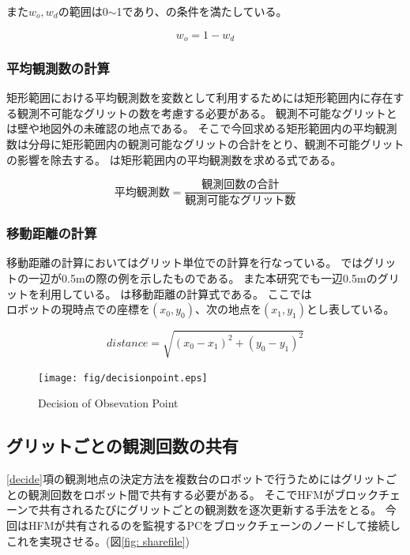 \documentclass{jsarticle}
\begin{document}
また$w_o,w_d$の範囲は0$\sim$1であり、の条件を満たしている。

\begin{equation}
  w_o = 1 - w_d
	\label{eqn: weight}
\end{equation}

\subsubsection{平均観測数の計算}
矩形範囲における平均観測数を変数として利用するためには矩形範囲内に存在する観測不可能なグリットの数を考慮する必要がある。
観測不可能なグリットとは壁や地図外の未確認の地点である。
そこで今回求める矩形範囲内の平均観測数は分母に矩形範囲内の観測可能なグリットの合計をとり、観測不可能グリットの影響を除去する。
は矩形範囲内の平均観測数を求める式である。

\begin{equation}
  平均観測数 = \frac{観測回数の合計}{観測可能なグリット数}
	\label{eqn: observation}
\end{equation}

\subsubsection{移動距離の計算}
移動距離の計算においてはグリット単位での計算を行なっている。
ではグリットの一辺が0.5mの際の例を示したものである。
また本研究でも一辺0.5mのグリットを利用している。
は移動距離の計算式である。
ここでは$ロボットの現時点での座標を(x_0, y_0)、次の地点を(x_1,y_1)$とし表している。


\begin{equation}
  distance = \sqrt{(x_0-x_1)^2 + (y_0-y_1)^2}
	\label{eqn: distance}
\end{equation}


\begin{figure}[tbh]
 \centering
  \texttt{[image: fig/decisionpoint.eps]}
  \vspace*{-4mm}
  \caption{Decision of Obsevation Point}
  \label{fig: value-method}
\end{figure}

\subsection{グリットごとの観測回数の共有}
\ref{decide}項の観測地点の決定方法を複数台のロボットで行うためにはグリットごとの観測回数をロボット間で共有する必要がある。
そこでHFMがブロックチェーンで共有されるたびにグリットごとの観測数を逐次更新する手法をとる。
今回はHFMが共有されるのを監視するPCをブロックチェーンのノードして接続しこれを実現させる。(図\ref{fig: sharefile})
\end{document}

